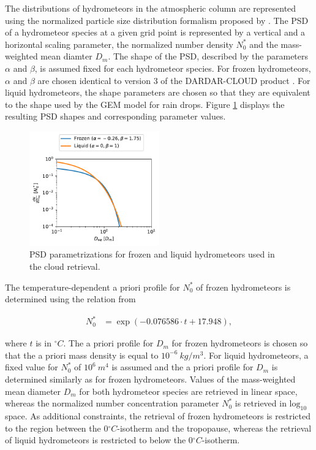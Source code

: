\documentclass[journal abbreviation, manuscript]{copernicus}
\begin{document}
The distributions of hydrometeors in the atmospheric column are represented
using the normalized particle size distribution formalism proposed by
\cite{delanoe05}. The PSD of a hydrometeor species at a given grid point is
represented by a vertical and a horizontal scaling parameter, the normalized
number density $N_0^*$ and the mass-weighted mean diamter $D_m$. The shape of
the PSD, described by the parameters $\alpha$ and $\beta$, is assumed fixed for
each hydrometeor species. For frozen hydrometeors, $\alpha$ and $\beta$ are
chosen identical to version 3 of the DARDAR-CLOUD product \citep{cazenave18}.
For liquid hydrometeors, the shape parameters are chosen so that they are
equivalent to the shape used by the GEM model for rain drops. Figure
\ref{fig:psds_retrieval} displays the resulting PSD shapes and corresponding
parameter values.

\begin{figure}
\centering
\includegraphics[width = 0.5\textwidth]{../plots/psds_retrieval}
\caption{PSD parametrizations for frozen and liquid hydrometeors
 used in the cloud retrieval.}
\label{fig:psds_retrieval}
\end{figure}

The temperature-dependent a priori profile for $N_0^*$ of frozen
hydrometeors is determined using the relation from \cite{delanoe14}

\begin{align}
N_0^* &= \exp (-0.076586 \cdot t + 17.948),
\end{align}

where $t$ is in $\unit{^\circ C}$. The a priori profile for $D_m$ for frozen
hydrometeors is chosen so that the a priori mass density is equal to
$10^{-6}\ \unit{kg/m^3}$. For liquid hydrometeors, a
fixed value for $N_0^*$ of $10^6\ \unit{m^4}$ is assumed and the
a priori profile for $D_m$ is determined similarly as for frozen
hydrometeors. Values of the mass-weighted mean diameter $D_m$ for both
hydrometeor species are retrieved in linear space, whereas the normalized
number concentration parameter $N_0^*$ is retrieved in $\text{log}_{10}$
space. As additional constraints, the retrieval of frozen hydrometeors is
restricted to the region between the $0\unit{^\circ C}$-isotherm and
the tropopause, whereas the retrieval of liquid hydrometeors is restricted 
to below the $0\unit{^\circ C}$-isotherm.
\end{document}
